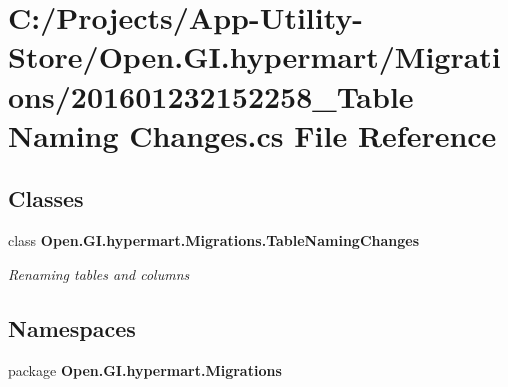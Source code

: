 \section{C\+:/\+Projects/\+App-\/\+Utility-\/\+Store/\+Open.G\+I.\+hypermart/\+Migrations/201601232152258\+\_\+\+Table Naming Changes.\+cs File Reference}
\label{201601232152258___table_01_naming_01_changes_8cs}
\subsection*{Classes}
\begin{DoxyCompactItemize}
\item 
class {\bf Open.\+G\+I.\+hypermart.\+Migrations.\+Table\+Naming\+Changes}
\begin{DoxyCompactList}\small\item\em Renaming tables and columns \end{DoxyCompactList}\end{DoxyCompactItemize}
\subsection*{Namespaces}
\begin{DoxyCompactItemize}
\item 
package {\bf Open.\+G\+I.\+hypermart.\+Migrations}
\end{DoxyCompactItemize}
